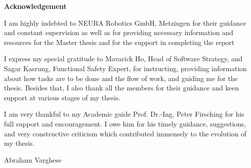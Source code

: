 \documentclass[12pt]{report}
\begin{document}
\newpage

\tableofcontents
\newpage
\listoffigures
{}
\newpage
\listoftables
{}
\newpage
\raggedright
{}
\begin{center}
    \textbf{Acknowledgement}
\end{center}
\raggedright

I am highly indebted to NEURA Robotics GmbH, Metzingen for their guidance and constant supervision as well as for providing necessary information and resources for the Master thesis and for the support in completing the report

\vspace{1cm}
    
I express my special gratitude to Mavarick Ho, Head of Software Strategy, and Sagar Kasrung, Functional Safety Expert, for instructing, providing information about how tasks are to be done and the flow of work, and guiding me for the thesis. Besides that, I also thank all the members for their guidance and keen support at various stages of my thesis.

\vspace{1cm}

I am very thankful to my Academic guide Prof. Dr.-Ing, Peter Firsching for his full support and encouragement. I owe him for his timely guidance, suggestions, and very constructive criticism which contributed immensely to the evolution of my thesis.
    
\vspace{1.5 cm}
        
\raggedleft
Abraham Varghese

\newpage
\end{document}
